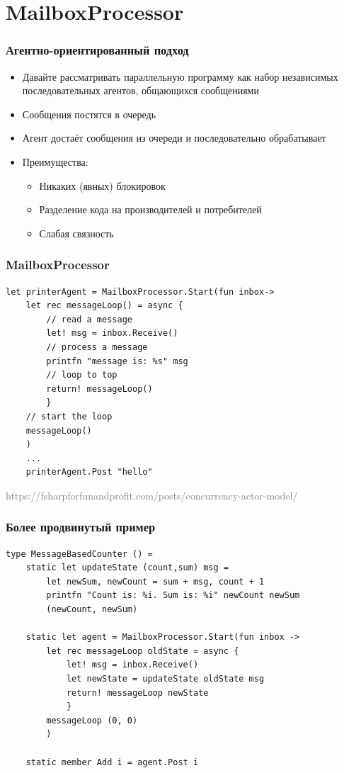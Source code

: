 \documentclass[xetex,mathserif,serif]{beamer}
\newcommand{\attribution}[1] {
    \begin{flushright}\begin{scriptsize}\textcolor{gray}{#1}\end{scriptsize}\end{flushright}
}
\begin{document}
    \section{MailboxProcessor}

    \begin{frame}
        \frametitle{Агентно-ориентированный подход}
        \begin{itemize}
            \item Давайте рассматривать параллельную программу как набор независимых последовательных агентов, общающихся сообщениями
            \item Сообщения постятся в очередь
            \item Агент достаёт сообщения из очереди и последовательно обрабатывает
            \item Преимущества:
            \begin{itemize}
                \item Никаких (явных) блокировок
                \item Разделение кода на производителей и потребителей
                \item Слабая связность
            \end{itemize}
        \end{itemize}
    \end{frame}

    \begin{frame}[fragile]
        \frametitle{MailboxProcessor}
        \begin{verbatim}
let printerAgent = MailboxProcessor.Start(fun inbox->
    let rec messageLoop() = async {
        // read a message
        let! msg = inbox.Receive()
        // process a message
        printfn "message is: %s" msg
        // loop to top
        return! messageLoop()
        }
    // start the loop
    messageLoop()
    )
    ...
    printerAgent.Post "hello"
        \end{verbatim}
        \attribution{https://fsharpforfunandprofit.com/posts/concurrency-actor-model/}
    \end{frame}

    \begin{frame}[fragile]
        \frametitle{Более продвинутый пример}
        \begin{verbatim}
type MessageBasedCounter () =
    static let updateState (count,sum) msg =
        let newSum, newCount = sum + msg, count + 1
        printfn "Count is: %i. Sum is: %i" newCount newSum
        (newCount, newSum)

    static let agent = MailboxProcessor.Start(fun inbox ->
        let rec messageLoop oldState = async {
            let! msg = inbox.Receive()
            let newState = updateState oldState msg
            return! messageLoop newState
            }
        messageLoop (0, 0)
        )

    static member Add i = agent.Post i
        \end{verbatim}
    \end{frame}
\end{document}
